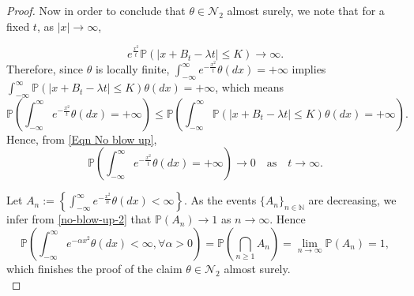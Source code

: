 \documentclass[a4paper,reqno]{amsart}%
\newcommand{\1}{\mathbf 1}
\theoremstyle{mine}
\numberwithin{theorem}{section}
\numberwithin{equation}{section}
\theoremstyle{remark}
\begin{document}
\begin{proof}
    Now in order to conclude that $\theta \in \mathcal{N}_2$ almost surely, we note that for a fixed $t$, as $|x|\to\infty$, 
      
      \begin{equation}
        e^{\frac{x^2}{t}}\mathbb{P}\left(|x+B_t-\lambda t|\le K \right) \longrightarrow \infty.
    \end{equation}
    Therefore, since $\theta$ is locally finite, $\int_{-\infty}^{\infty} e^{-\frac{x^2}{t}}\theta(dx) = +\infty$ implies $\int_{-\infty}^{\infty}\mathbb{P}(|x+B_t-\lambda t|\le K)\theta(dx) = +\infty$, which means
    \begin{equation}
        \mathbb{P}\left( \int_{-\infty}^{\infty}e^{-\frac{x^2}{t}}\theta(dx) = +\infty \right) \le \mathbb{P}\left( \int_{-\infty}^{\infty}\mathbb{P}(|x+B_t-\lambda t|\le K)\theta(dx) = +\infty \right).
    \end{equation}
    Hence, from \eqref{Eqn No blow up}, 
    \begin{equation}\label{no-blow-up-2}
        \mathbb{P}\left( \int_{-\infty}^{\infty}e^{-\frac{x^2}{t}}\theta(dx) = +\infty \right)\longrightarrow 0 \quad \text{as}\quad t\to\infty.
    \end{equation}

    Let $A_{n}:=\left\{\int_{-\infty}^{\infty}e^{-\frac{x^2}{n}}\theta(dx) < \infty \right\}$. As the events $\{A_{n}\}_{n\in\mathbb{N}}$ are decreasing, we infer from \eqref{no-blow-up-2} that $\mathbb{P}(A_{n}) \to 1$ as $n\to\infty$. Hence
    \begin{equation}
        \mathbb{P}\left(\int_{-\infty}^{\infty}e^{-\alpha x^2}\theta(dx) <\infty ,\forall \alpha >0\right) = \mathbb{P}\left( \bigcap_{n\ge1}A_{n}\right) = \lim_{n\to\infty}\mathbb{P}(A_{n}) = 1,
    \end{equation}
    which finishes the proof of the claim $\theta \in \mathcal{N}_2$ almost surely. \\


\end{proof}
\end{document}
